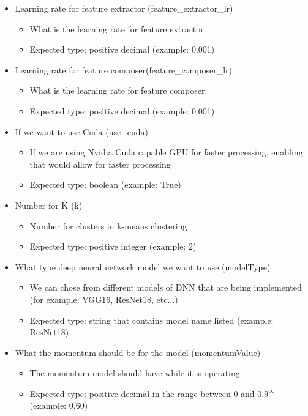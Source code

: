 \begin{itemize}
    \item Learning rate for feature extractor (feature{\_}extractor{\_}lr)
    \begin{itemize}
        \item What is the learning rate for feature extractor.
        \item Expected type: positive decimal (example: 0.001)
    \end{itemize}
    
    \item Learning rate for feature composer(feature{\_}composer{\_}lr)
    \begin{itemize}
        \item What is the learning rate for feature composer.
        \item Expected type: positive decimal (example: 0.001)
    \end{itemize}
    
    \item If we want to use Cuda (use{\_}cuda)
    \begin{itemize}
        \item If we are using Nvidia Cuda capable GPU for faster processing, enabling that would allow for faster processing
        \item Expected type: boolean (example: True)
    \end{itemize}
    
    \item Number for K (k)
    \begin{itemize}
        \item Number for clusters in k-means clustering
        \item Expected type: positive integer (example: 2)
    \end{itemize}
    
    \item What type deep neural network model we want to use (modelType)
    \begin{itemize}
        \item We can chose from different models of DNN that are being implemented (for example: VGG16, ResNet18, etc...)
        \item Expected type: string that contains model name listed (example: ResNet18)
    \end{itemize}
    
    \item What the momentum should be for the model (momentumValue)
    \begin{itemize}
        \item The momentum model should have while it is operating
        \item Expected type: positive decimal in the range between 0 and \(0.9^{\infty}\) (example: 0.60)
    \end{itemize}
    

\end{itemize}
